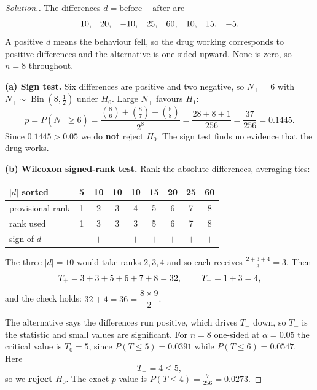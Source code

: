 \documentclass[11pt,a4paper]{article}
\theoremstyle{definition}
\newenvironment{solution}
  {\renewcommand{\qedsymbol}{}\begin{proof}[\textit{Solution}.]}
  {\end{proof}}
\begin{document}
\begin{solution}
The differences $d=\text{before}-\text{after}$ are
$$10,\hspace{0.3cm}20,\hspace{0.3cm}-10,\hspace{0.3cm}25,\hspace{0.3cm}60,
\hspace{0.3cm}10,\hspace{0.3cm}15,\hspace{0.3cm}-5 .$$
A positive $d$ means the behaviour fell, so the drug working corresponds to
positive differences and the alternative is one-sided upward. None is zero, so
$n=8$ throughout.

\textbf{(a) Sign test.} Six differences are positive and two negative, so
$N_{+}=6$ with $N_{+}\sim\operatorname{Bin}\left(8,\tfrac{1}{2}\right)$ under
$H_0$. Large $N_{+}$ favours $H_1$:
$$p=P\left(N_{+}\geq 6\right)
=\dfrac{\binom{8}{6}+\binom{8}{7}+\binom{8}{8}}{2^{8}}
=\dfrac{28+8+1}{256}=\dfrac{37}{256}=0.1445 .$$
Since $0.1445>0.05$ we do \textbf{not} reject $H_0$. The sign test finds no
evidence that the drug works.

\textbf{(b) Wilcoxon signed-rank test.} Rank the absolute differences, averaging
ties:

\begin{table}[H]
\centering
\begin{tabular}{l|cccccccc}
$\left|d\right|$ sorted &5&10&10&10&15&20&25&60\\
\hline
provisional rank &1&2&3&4&5&6&7&8\\
rank used &1&3&3&3&5&6&7&8\\
sign of $d$ &$-$&$+$&$-$&$+$&$+$&$+$&$+$&$+$\\
\end{tabular}
\end{table}

The three $\left|d\right|=10$ would take ranks $2,3,4$ and so each receives
$\frac{2+3+4}{3}=3$. Then
$$T_{+}=3+3+5+6+7+8=32,\hspace{0.8cm}T_{-}=1+3=4,$$
and the check holds: $32+4=36=\dfrac{8\times 9}{2}$.

The alternative says the differences run positive, which drives $T_{-}$ down, so
$T_{-}$ is the statistic and small values are significant. For $n=8$ one-sided at
$\alpha=0.05$ the critical value is $T_0=5$, since $P\left(T\leq 5\right)=0.0391$
while $P\left(T\leq 6\right)=0.0547$. Here
$$T_{-}=4\leq 5,$$
so we \textbf{reject} $H_0$. The exact $p$-value is
$P\left(T\leq 4\right)=\frac{7}{256}=0.0273$.


\end{solution}
\end{document}
